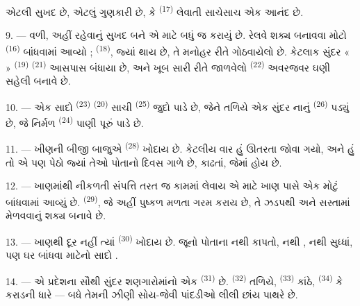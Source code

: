  એટલી સુખદ છે,  એટલું ગુણકારી છે, કે
 \textsuperscript{(17)} લેવાતી 
સાચેસાચ એક આનંદ છે.

\VUsaut{3.0mm}
\VUsaut{3.0mm}

9. --- વળી, અહીં રહેવાનું સુખદ બને એ માટે બધું જ કરાયું છે. રેલવે શક્ય
બનાવવા મોટો  \textsuperscript{(16)} બાંધવામાં આવ્યો ;
  \textsuperscript{(18)}, જ્યાં
 થાય છે, તે મનોહર રીતે ગોઠવાયેલો છે. કેટલાક સુંદર
«  » \textsuperscript{(19)} 
\textsuperscript{(21)} આસપાસ બંધાયા છે, અને ખૂબ સારી રીતે જાળવેલો
 \textsuperscript{(22)} અવરજવર ઘણી સહેલી બનાવે છે.

10. --- એક સાદો  \textsuperscript{(23)} 
\textsuperscript{(20)} સાચી  \textsuperscript{(25)} જુદો
પાડે છે, જેને તળિયે એક સુંદર નાનું 
\textsuperscript{(26)} પડ્યું છે, જે નિર્મળ 
\textsuperscript{(24)} પાણી પૂરું પાડે છે.

11. --- ખીણની બીજી બાજુએ  \textsuperscript{(28)}
ખોદાય છે. કેટલીય વાર હું   ઊતરતા
જોવા ગયો, અને હું તો એ  પણ પેઠો જ્યાં તેઓ પોતાનો દિવસ
ગાળે છે,  કાઢતાં, જેમાં  હોય છે.

12. --- ખાણમાંથી નીકળતી સંપત્તિ તરત જ કામમાં લેવાય એ માટે ખાણ પાસે એક
મોટું  બાંધવામાં આવ્યું છે.  \textsuperscript{(29)}, જે અહીં પુષ્કળ મળતા 
ગરમ કરાય છે, તે ઝડપથી અને સસ્તામાં  મેળવવાનું
શક્ય બનાવે છે.

13. --- ખાણથી દૂર નહીં ત્યાં  \textsuperscript{(30)}
ખોદાય છે. જૂનો  પોતાના  નથી
 કાપતો, નથી , નથી  સુધ્ધાં, પણ ઘર બાંધવા માટેનો સાદો .

14. --- એ પ્રદેશના સૌથી સુંદર શણગારોમાંનો એક 
\textsuperscript{(31)} છે.  \textsuperscript{(32)}
તળિયે,  \textsuperscript{(33)} કાંઠે,
 \textsuperscript{(34)} કે કરાડની ધારે — બધે તેમની ઝીણી
સોય-જેવી પાંદડીઓ લીલી છાંય પાથરે છે.

\VUsaut{3.0mm}
\VUsaut{3.0mm}

